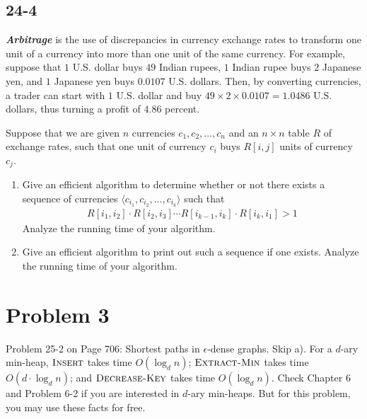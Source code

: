 \documentclass{../../class}
\begin{document}
\subsection*{24-4}
\textbf{\textit{Arbitrage}} is the use of discrepancies in currency exchange rates to transform one unit of a currency into more than one unit of the same currency. For example, suppose that $1$ U.S. dollar buys $49$ Indian rupees, $1$ Indian rupee buys $2$ Japanese yen, and $1$ Japanese yen buys $0.0107$ U.S. dollars. Then, by converting currencies, a trader can start with $1$ U.S. dollar and buy $49\times 2 \times 0.0107 = 1.0486$ U.S. dollars, thus turning a profit of $4.86$ percent.

Suppose that we are given $n$ currencies $c_1, c_2, \dots, c_n$ and an $n\times n$ table $R$ of exchange rates, such that one unit of currency $c_i$ buys $R[i, j]$ units of currency $c_j$.

\begin{enumerate}
    \item Give an efficient algorithm to determine whether or not there exists a sequence of currencies $\langle c_{i_1}, c_{i_2}, \dots, c_{i_k} \rangle $ such that
    \begin{gather*}
        R[i_1, i_2]\cdot R[i_2, i_3]\cdots R[i_{k-1}, i_k] \cdot R[i_k, i_1] > 1
    \end{gather*}
    Analyze the running time of your algorithm.
    \item Give an efficient algorithm to print out such a sequence if one exists. Analyze the running time of your algorithm.
\end{enumerate}

\newpage
\section*{Problem 3}
\begin{tcolorbox}
    Problem 25-2 on Page 706: Shortest paths in $\epsilon$-dense graphs. Skip a). For a $d$-ary min-heap, $\textsc{Insert}$ takes time $O(\log_d{n})$; $\textsc{Extract-Min}$ takes time $O(d\cdot \log_d{n})$; and $\textsc{Decrease-Key}$ takes time $O(\log_d{n})$. Check Chapter 6 and Problem 6-2 if you are interested in $d$-ary min-heaps. But for this problem, you may use these facts for free.
\end{tcolorbox}
\end{document}
